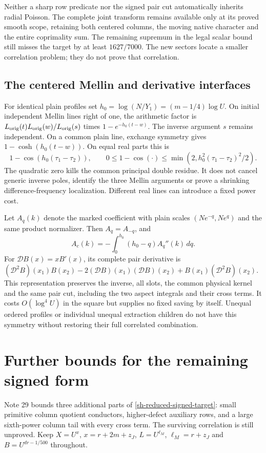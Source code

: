\documentclass[11pt]{article}
\theoremstyle{definition}
\begin{document}
Neither a sharp row predicate nor the signed pair cut automatically
inherits radial Poisson. The complete joint transform remains available
only at its proved smooth scope, retaining both centered columns,
the moving native character and the entire coprimality sum.
The remaining supremum in the legal scalar bound still misses the
target by at least $1627/7000$. The new sectors locate a smaller
correlation problem; they do not prove that correlation.

\subsection{The centered Mellin and derivative interfaces}
For identical plain profiles set
$h_0=\log(N/Y_1)=(m-1/4)\log U$.
On initial independent Mellin lines right of one, the arithmetic
factor is $L_{\rm orig}(t)L_{\rm orig}(w)/L_{\rm orig}(s)$
times $1-e^{-h_0(t-w)}$. The inverse argument $s$ remains
independent. On a common plain line, exchange symmetry gives
$1-\cosh(h_0(t-w))$. On equal real parts this is
\[
 1-\cos(h_0(\tau_1-\tau_2)),\qquad
 0\le1-\cos(\cdot)\le
 \min(2,h_0^2(\tau_1-\tau_2)^2/2).
\]
The quadratic zero kills the common principal double residue.
It does not cancel generic inverse poles, identify the three Mellin
arguments or prove a shrinking difference-frequency localization.
Different real lines can introduce a fixed power cost.

Let $A_q(k)$ denote the marked coefficient with plain scales
$(Ne^{-q},Ne^q)$ and the same product normalizer. Then
$A_q=A_{-q}$, and
\[
 A_c(k)=-\int_0^{h_0}(h_0-q)A_q''(k)\,dq .
\]
For $\mathcal DB(x)=xB'(x)$, its complete pair derivative is
$(\mathcal D^2B)(x_1)B(x_2)
-2(\mathcal DB)(x_1)(\mathcal DB)(x_2)
+B(x_1)(\mathcal D^2B)(x_2)$.
This representation preserves the inverse, all slots, the common
physical kernel and the same pair cut, including the two aspect
integrals and their cross terms. It costs $O(\log^4U)$ in the square
but supplies no fixed saving by itself. Unequal ordered profiles or
individual unequal extraction children do not have this symmetry
without restoring their full correlated combination.


\section{Further bounds for the remaining signed form}\label{fb-sec}
Note 29 \cite{n29} bounds three additional parts of
\eqref{sh-reduced-signed-target}: small primitive column quotient
conductors, higher-defect auxiliary rows, and a large sixth-power
column tail with every cross term. The surviving correlation is still
unproved. Keep $X=U^x$, $x=r+2m+z_J$, $L=U^{\ell_M}$,
$\ell_M=r+z_J$ and $B=U^{dr-1/500}$ throughout.
\end{document}
